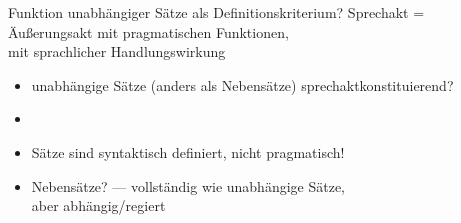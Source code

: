 \begin{frame}
  {Funktion unabhängiger Sätze als Definitionskriterium?}
  \pause
  Sprechakt = Äußerungsakt mit pragmatischen Funktionen,\\
  mit sprachlicher Handlungswirkung
  \Viertelzeile
  \pause
  \begin{itemize}[<+->]
    \item unabhängige Sätze (anders als Nebensätze) \alert{sprechaktkonstituierend}?
  \end{itemize}
  \pause
  \begin{exe}
    \ex\label{ex:hauptsatzundmatrixsatz007}
    \begin{xlist}
      \pause
      \pause
      \pause
    \end{xlist}
  \end{exe}
  \pause
  \begin{itemize}[<+->]
    \item {}
    \item \alert{Sätze sind syntaktisch definiert, nicht pragmatisch!}
    \item \alert{Nebensätze}? --- vollständig wie unabhängige Sätze,\\
      aber \alert{abhängig}\slash \alert{regiert}
  \end{itemize}
\end{frame}


